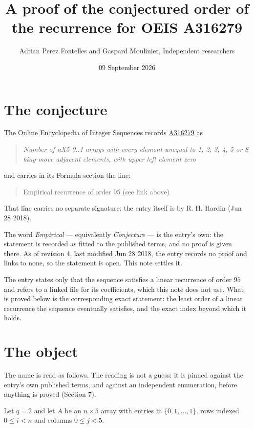 \documentclass[11pt]{article}
\title{A proof of the conjectured order of the recurrence for OEIS A316279}
\author{Adrian Perez Fontelles and Gaspard Moulinier, Independent researchers}
\date{09 September 2026}
\theoremstyle{definition}
\begin{document}
\maketitle
\section{The conjecture}

The Online Encyclopedia of Integer Sequences records \href{https://oeis.org/A316279}{A316279} as

\begin{quote}\itshape Number of nX5 0..1 arrays with every element unequal to 1, 2, 3, 4, 5 or 8 king-move adjacent elements, with upper left element zero\end{quote}

and carries in its Formula section the line:

\begin{quote}\ttfamily Empirical recurrence of order 95 (see link above)\end{quote}

That line carries no separate signature; the entry itself is by R. H. Hardin (Jun 28 2018).

The word {\itshape Empirical} --- equivalently {\itshape Conjecture} --- is the entry's own: the statement is recorded as fitted to the published terms, and no proof is given there. As of revision 4, last modified Jun 28 2018, the entry records no proof and links to none, so the statement is open. This note settles it.

The entry states only that the sequence satisfies a linear recurrence of order $95$ and refers to a linked file for its coefficients, which this note does not use. What is proved below is the corresponding exact statement: the least order of a linear recurrence the sequence eventually satisfies, and the exact index beyond which it holds.

\section{The object}

The name is read as follows. The reading is not a guess: it is pinned against the entry's own published terms, and against an independent enumeration, before anything is proved (Section 7).

Let $q = 2$ and let $A$ be an $n \times 5$ array with entries in $\{0,1,\dots,1\}$, rows indexed $0 \le i < n$ and columns $0 \le j < 5$.
\end{document}
